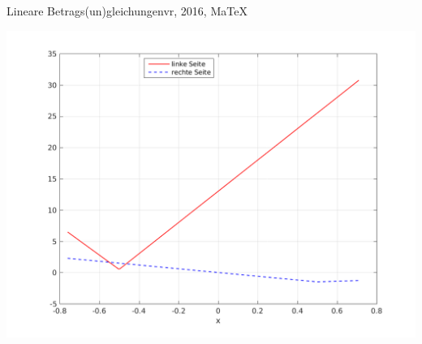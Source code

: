 \begin{MAufgabe}{Lineare Betrags(un)gleichungen}{vr, 2016, MaTeX}
 \begin{center}
 \includegraphics[width=0.8\linewidth]{Abb_zur_Ag_autogenerated_abs_10.png} \end{center}
 
\else\relax\fi
 \end{MAufgabe}